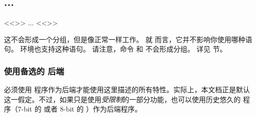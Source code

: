 \begin{ltxexample}
\chapter{...}
<<>>
...
<<\endrefsection>>
\end{ltxexample}
%
这不会形成一个分组，但是像正常一样工作。
就 \biblatex 而言，它并不影响你使用哪种语句。
 环境也支持这种语句。
请注意，命令  和  不会形成分组。
详见  节。

\subsection{使用备选的 \BibTeX 后端}%
\label{use:bibtex}


\biblatex 必须使用 \biber 程序作为后端才能使用这里描述的所有特性。实际上，本文档正是默认这一假定。不过，如果只是使用\emph{受限制}的一部分功能，也可以使用历史悠久的 \BibTeX 程序（7-bit 的   或者 8-bit 的 ）作为后端程序。



